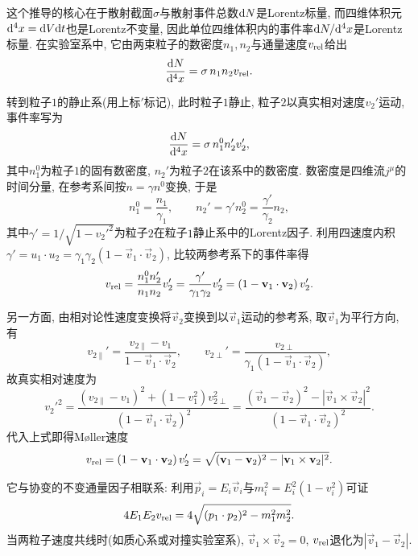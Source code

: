 \begin{example}\label{moller-velocity-derivation}
    这个推导的核心在于散射截面$\sigma$与散射事件总数$\d N$是Lorentz标量, 而四维体积元$\d^4x=\d V\d t$也是Lorentz不变量, 因此单位四维体积内的事件率$\d N/\d^4x$是Lorentz标量. 在实验室系中, 它由两束粒子的数密度$n_1, n_2$与通量速度$v_{\rm{rel}}$给出
    \begin{equation}
        \frac{\d N}{\d^4x}=\sigma\, n_1 n_2 v_{\rm{rel}}.
    \end{equation}

    转到粒子$1$的静止系(用上标$'$标记), 此时粒子$1$静止, 粒子$2$以真实相对速度$v_2'$运动, 事件率写为
    \begin{equation}
        \frac{\d N}{\d^4x}=\sigma\, n_1^0 n_2' v_2',
    \end{equation}
    其中$n_1^0$为粒子$1$的固有数密度, $n_2'$为粒子$2$在该系中的数密度. 数密度是四维流$j^\mu$的时间分量, 在参考系间按$n=\gamma n^0$变换, 于是
    \begin{equation}
        n_1^0=\frac{n_1}{\gamma_1},\qquad n_2'=\gamma' n_2^0=\frac{\gamma'}{\gamma_2}n_2,
    \end{equation}
    其中$\gamma'=1/\sqrt{1-v_2'^2}$为粒子$2$在粒子$1$静止系中的Lorentz因子. 利用四速度内积$\gamma'=u_1\cdot u_2=\gamma_1\gamma_2(1-\vec v_1\cdot\vec v_2)$, 比较两参考系下的事件率得
    \begin{equation}
        v_{\rm{rel}}=\frac{n_1^0 n_2'}{n_1 n_2}v_2'=\frac{\gamma'}{\gamma_1\gamma_2}v_2'=(1-\vec v_1\cdot\vec v_2)\,v_2'.
    \end{equation}

    另一方面, 由相对论性速度变换将$\vec v_2$变换到以$\vec v_1$运动的参考系, 取$\vec v_1$为平行方向, 有
    \begin{equation}
        v_{2\parallel}'=\frac{v_{2\parallel}-v_1}{1-\vec v_1\cdot\vec v_2},\qquad v_{2\perp}'=\frac{v_{2\perp}}{\gamma_1(1-\vec v_1\cdot\vec v_2)},
    \end{equation}
    故真实相对速度为
    \begin{equation}
        v_2'^2=\frac{(v_{2\parallel}-v_1)^2+(1-v_1^2)v_{2\perp}^2}{(1-\vec v_1\cdot\vec v_2)^2}=\frac{(\vec v_1-\vec v_2)^2-|\vec v_1\times\vec v_2|^2}{(1-\vec v_1\cdot\vec v_2)^2}.
    \end{equation}
    代入上式即得Møller速度
    \begin{equation}
        v_{\rm{rel}}=(1-\vec v_1\cdot\vec v_2)\,v_2'=\sqrt{(\vec v_1-\vec v_2)^2-|\vec v_1\times\vec v_2|^2}.
    \end{equation}

    它与协变的不变通量因子相联系: 利用$\vec p_i=E_i\vec v_i$与$m_i^2=E_i^2(1-v_i^2)$可证
    \begin{equation}
        4E_1E_2 v_{\rm{rel}}=4\sqrt{(p_1\cdot p_2)^2-m_1^2m_2^2}.
    \end{equation}
    当两粒子速度共线时(如质心系或对撞实验室系), $\vec v_1\times\vec v_2=0$, $v_{\rm{rel}}$退化为$|\vec v_1-\vec v_2|$.
\end{example}

